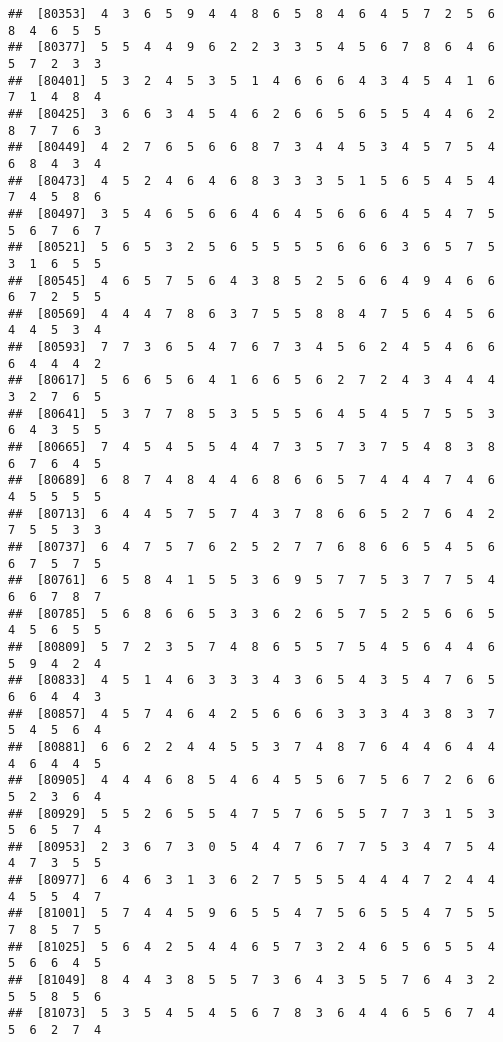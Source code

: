 \documentclass[
]{book}
\begin{document}
\begin{verbatim}
##  [80353]  4  3  6  5  9  4  4  8  6  5  8  4  6  4  5  7  2  5  6  8  4  6  5  5
##  [80377]  5  5  4  4  9  6  2  2  3  3  5  4  5  6  7  8  6  4  6  5  7  2  3  3
##  [80401]  5  3  2  4  5  3  5  1  4  6  6  6  4  3  4  5  4  1  6  7  1  4  8  4
##  [80425]  3  6  6  3  4  5  4  6  2  6  6  5  6  5  5  4  4  6  2  8  7  7  6  3
##  [80449]  4  2  7  6  5  6  6  8  7  3  4  4  5  3  4  5  7  5  4  6  8  4  3  4
##  [80473]  4  5  2  4  6  4  6  8  3  3  3  5  1  5  6  5  4  5  4  7  4  5  8  6
##  [80497]  3  5  4  6  5  6  6  4  6  4  5  6  6  6  4  5  4  7  5  5  6  7  6  7
##  [80521]  5  6  5  3  2  5  6  5  5  5  5  6  6  6  3  6  5  7  5  3  1  6  5  5
##  [80545]  4  6  5  7  5  6  4  3  8  5  2  5  6  6  4  9  4  6  6  6  7  2  5  5
##  [80569]  4  4  4  7  8  6  3  7  5  5  8  8  4  7  5  6  4  5  6  4  4  5  3  4
##  [80593]  7  7  3  6  5  4  7  6  7  3  4  5  6  2  4  5  4  6  6  6  4  4  4  2
##  [80617]  5  6  6  5  6  4  1  6  6  5  6  2  7  2  4  3  4  4  4  3  2  7  6  5
##  [80641]  5  3  7  7  8  5  3  5  5  5  6  4  5  4  5  7  5  5  3  6  4  3  5  5
##  [80665]  7  4  5  4  5  5  4  4  7  3  5  7  3  7  5  4  8  3  8  6  7  6  4  5
##  [80689]  6  8  7  4  8  4  4  6  8  6  6  5  7  4  4  4  7  4  6  4  5  5  5  5
##  [80713]  6  4  4  5  7  5  7  4  3  7  8  6  6  5  2  7  6  4  2  7  5  5  3  3
##  [80737]  6  4  7  5  7  6  2  5  2  7  7  6  8  6  6  5  4  5  6  6  7  5  7  5
##  [80761]  6  5  8  4  1  5  5  3  6  9  5  7  7  5  3  7  7  5  4  6  6  7  8  7
##  [80785]  5  6  8  6  6  5  3  3  6  2  6  5  7  5  2  5  6  6  5  4  5  6  5  5
##  [80809]  5  7  2  3  5  7  4  8  6  5  5  7  5  4  5  6  4  4  6  5  9  4  2  4
##  [80833]  4  5  1  4  6  3  3  3  4  3  6  5  4  3  5  4  7  6  5  6  6  4  4  3
##  [80857]  4  5  7  4  6  4  2  5  6  6  6  3  3  3  4  3  8  3  7  5  4  5  6  4
##  [80881]  6  6  2  2  4  4  5  5  3  7  4  8  7  6  4  4  6  4  4  4  6  4  4  5
##  [80905]  4  4  4  6  8  5  4  6  4  5  5  6  7  5  6  7  2  6  6  5  2  3  6  4
##  [80929]  5  5  2  6  5  5  4  7  5  7  6  5  5  7  7  3  1  5  3  5  6  5  7  4
##  [80953]  2  3  6  7  3  0  5  4  4  7  6  7  7  5  3  4  7  5  4  4  7  3  5  5
##  [80977]  6  4  6  3  1  3  6  2  7  5  5  5  4  4  4  7  2  4  4  4  5  5  4  7
##  [81001]  5  7  4  4  5  9  6  5  5  4  7  5  6  5  5  4  7  5  5  7  8  5  7  5
##  [81025]  5  6  4  2  5  4  4  6  5  7  3  2  4  6  5  6  5  5  4  5  6  6  4  5
##  [81049]  8  4  4  3  8  5  5  7  3  6  4  3  5  5  7  6  4  3  2  5  5  8  5  6
##  [81073]  5  3  5  4  5  4  5  6  7  8  3  6  4  4  6  5  6  7  4  5  6  2  7  4

\end{verbatim}
\end{document}
